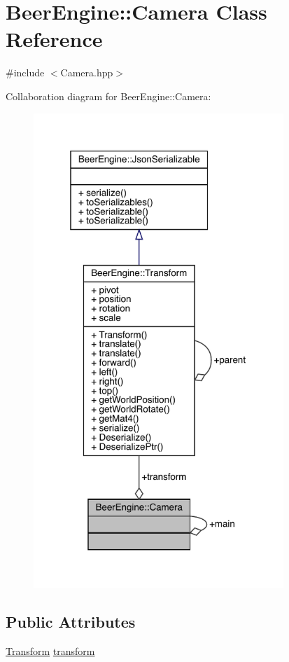 \hypertarget{class_beer_engine_1_1_camera}{}\section{Beer\+Engine\+:\+:Camera Class Reference}
\label{class_beer_engine_1_1_camera}


{\ttfamily \#include $<$Camera.\+hpp$>$}



Collaboration diagram for Beer\+Engine\+:\+:Camera\+:\nopagebreak
\begin{figure}[H]
\begin{center}
\leavevmode
\includegraphics[width=268pt]{class_beer_engine_1_1_camera__coll__graph}
\end{center}
\end{figure}
\subsection*{Public Attributes}
\begin{DoxyCompactItemize}
\item 
\mbox{\hyperlink{class_beer_engine_1_1_transform}{Transform}} \mbox{\hyperlink{class_beer_engine_1_1_camera_a4bbec6c322e5f260eca34a98d2eaeb93}{transform}}
\end{DoxyCompactItemize}
